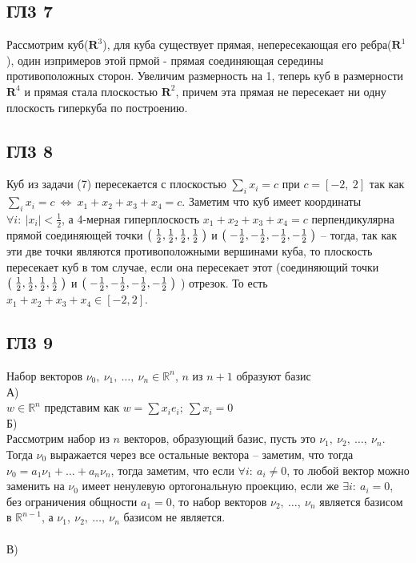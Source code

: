 		\subsection{ГЛ3 7}		
		Рассмотрим куб($\mathbf{R}^3$), для куба существует прямая, непересекающая его ребра($\mathbf{R}^1$), один изпримеров этой прмой - прямая соединяющая середины противоположных сторон. Увеличим размерность на 1, теперь куб в размерности $\mathbf{R}^4$ и прямая стала плоскостью $\mathbf{R}^2$, причем эта прямая не пересекает ни одну плоскость гиперкуба по построению.
		
		\subsection{ГЛ3 8}		
		Куб из задачи (7) пересекается с плоскостью $\sum_i x_i = c$ при $c = [-2,\ 2]$ так как $\sum_i x_i = c \ \Leftrightarrow \ x_1 + x_2 + x_3 + x_4 = c$. Заметим что куб имеет координаты $\forall i:\ |x_i| < \frac{1}{2}$, а 4-мерная гиперплоскость $x_1 + x_2 + x_3 + x_4 = c$ перпендикулярна прямой соединяющей точки $\bigm( \frac{1}{2},\frac{1}{2},\frac{1}{2},\frac{1}{2} \bigm)$ и $\bigm( -\frac{1}{2},-\frac{1}{2},-\frac{1}{2},-\frac{1}{2} \bigm)$ -- тогда, так как эти две точки являются противоположными вершинами куба, то плоскость пересекает куб в том случае, если она пересекает этот (соединяющий точки $\bigm( \frac{1}{2},\frac{1}{2},\frac{1}{2},\frac{1}{2} \bigm)$ и $\bigm( -\frac{1}{2},-\frac{1}{2},-\frac{1}{2},-\frac{1}{2} \bigm)$ ) отрезок. То есть $x_1 + x_2 + x_3 + x_4 \in [-2, 2]$.
		\subsection{ГЛ3 9}		 
		Набор векторов $\nu_0 ,\ \nu_1 ,\ \ldots,\ \nu_n \in \mathbb{R}^n$, $n$ из $n+1$ образуют базис\\
		А)\\
		$w \in \mathbb{R}^n$ представим как $w = \sum x_i e_i;\ \sum x_i = 0$	
		\\
		Б)\\
		Рассмотрим набор из $n$ векторов, образующий базис, пусть это $\nu_1 ,\ \nu_2 ,\ \ldots,\ \nu_n$. Тогда $\nu_0$ выражается через все остальные вектора -- заметим, что тогда $\nu_0 = a_{1} \nu_{1} + \ldots + a_{n} \nu_{n}$, тогда заметим, что если $\forall i:\ a_{i} \ne 0$, то любой вектор можно заменить на $\nu_0$ имеет ненулевую ортогональную проекцию, если же $\exists i:\ a_{i} = 0$, без ограничения общности $a_{1} = 0$, то набор векторов $\nu_{2},\ \ldots ,\ \nu_{n}$ является базисом в $\mathbb{R}^{n-1}$, а $\nu_{1},\ \nu_{2},\ \ldots ,\ \nu_{n}$ базисом не является.\\
		\\
		В)\\
		\\